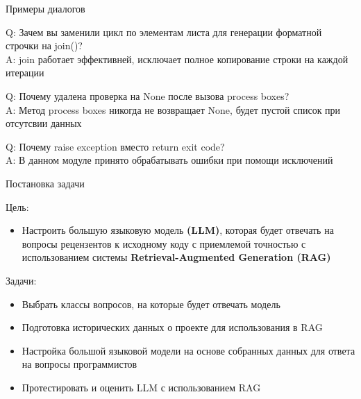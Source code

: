 \documentclass[aspectratio=169, fontsize=18pt]{beamer}
\begin{document}
\begin{frame}{Примеры диалогов}

\begin{block}{ }
    \textcolor{msured}{Q:} Зачем вы заменили цикл по элементам листа для генерации форматной строчки на join()?\\
    \textcolor{msuyellow}{A:} \textcolor{msugray}{join работает эффективней, исключает полное копирование строки на каждой итерации}\\

\end{block}

\begin{block}{ }
    \textcolor{msured}{Q:} Почему удалена проверка на None после вызова process boxes?\\

    \textcolor{msuyellow}{A:} \textcolor{msugray}{Метод process boxes никогда не возвращает None, будет пустой список при отсутсвии данных}

\end{block}

\begin{block}{ }
    \textcolor{msured}{Q:} Почему raise exception вместо return exit code?\\

    \textcolor{msuyellow}{A:} \textcolor{msugray}{В данном модуле принято обрабатывать ошибки при помощи исключений}

    
\end{block}
    
\end{frame}

\begin{frame}{Постановка задачи}
\begin{block}{Цель:}
    \begin{itemize}
        \item Настроить большую языковую модель \textbf{(LLM)}, которая будет отвечать на вопросы рецензентов к исходному коду с приемлемой точностью с использованием системы \textbf{Retrieval-Augmented Generation (RAG)}
    \end{itemize}
\end{block}
\begin{block}{Задачи:}
    \begin{itemize}
        \item Выбрать классы вопросов, на которые будет отвечать модель
        \item Подготовка исторических данных о проекте для использования в RAG
        \item Настройка большой языковой модели на основе собранных данных для ответа на вопросы программистов
        \item Протестировать и оценить LLM с использованием RAG
    \end{itemize}
\end{block}
\end{frame}
\end{document}
